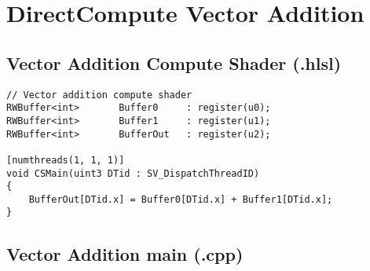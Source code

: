 
\chapter{DirectCompute Vector Addition} \label{appendix:DirectComputeVecAdd}


\section{Vector Addition Compute Shader (.hlsl)}
\begin{lstlisting}
// Vector addition compute shader
RWBuffer<int>		Buffer0		: register(u0);
RWBuffer<int>		Buffer1		: register(u1);
RWBuffer<int>		BufferOut   : register(u2);

[numthreads(1, 1, 1)]
void CSMain(uint3 DTid : SV_DispatchThreadID)
{
	BufferOut[DTid.x] = Buffer0[DTid.x] + Buffer1[DTid.x];
}

\end{lstlisting}





\section{Vector Addition main (.cpp) }

